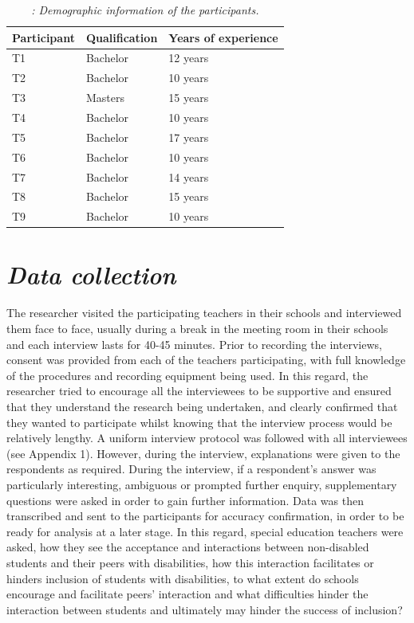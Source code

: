 \documentclass[11pt]{sig-alternate}
\begin{document}
\begin{large}
\begin{table}[]
\caption{\textit{: Demographic information of the participants.}}
\label{tab:my-table}
\begin{tabular}{|l|l|l|}
\hline
Participant & Qualification & Years of experience \\ \hline
T1      & Bachelor   & 12 years   \\ \hline
T2      & Bachelor   & 10 years   \\ \hline
T3      & Masters   & 15 years   \\ \hline
T4      & Bachelor   & 10 years \\ \hline
T5      & Bachelor   & 17 years \\ \hline
T6      & Bachelor   & 10 years \\ \hline
T7      & Bachelor   & 14 years \\ \hline
T8      & Bachelor   & 15 years \\ \hline
T9      & Bachelor   & 10 years \\ \hline
\end{tabular}
\end{table}

\section*{\textit{Data collection}}
The researcher visited the participating teachers in their schools and interviewed them face to face, usually during a break in the meeting room in their schools and each interview lasts for 40-45 minutes. Prior to recording the interviews, consent was provided from each of the teachers participating, with full knowledge of the procedures and recording equipment being used. In this regard, the researcher tried to encourage all the interviewees to be supportive and ensured that they understand the research being undertaken, and clearly confirmed that they wanted to participate whilst knowing that the interview process would be relatively lengthy. A uniform interview protocol was followed with all interviewees (see Appendix 1). However, during the interview, explanations were given to the respondents as required. During the interview, if a respondent’s answer was particularly interesting, ambiguous or prompted further enquiry, supplementary questions were asked in order to gain further information.  Data was then transcribed and sent to the participants for accuracy confirmation, in order to be ready for analysis at a later stage. In this regard, special education teachers were asked, how they see the acceptance and interactions between non-disabled students and their peers with disabilities, how this interaction facilitates or hinders inclusion of students with disabilities, to what extent do schools encourage and facilitate peers’ interaction and what difficulties hinder the interaction between students and ultimately may hinder the success of inclusion?   


\end{large}
\end{document}
